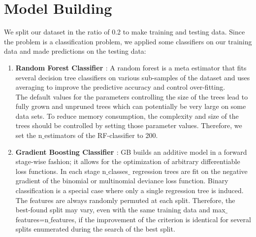 \documentclass[conference]{IEEEtran}
\begin{document}
\section{Model Building}
We split our dataset in the ratio of 0.2 to make training and testing data.
Since the problem is a classification problem, we applied some classifiers on our training data and made predictions on the testing data: 
\begin{enumerate}
    \item \textbf{Random Forest Classifier \cite{rf}}: A random forest is a meta estimator that fits several decision tree classifiers on various sub-samples of the dataset and uses averaging to improve the predictive accuracy and control over-fitting. \\
    The default values for the parameters controlling the size of the trees lead to fully grown and unpruned trees which can potentially be very large on some data sets. To reduce memory consumption, the complexity and size of the trees should be controlled by setting those parameter values. Therefore, we set the n$\_$estimators of the RF-classifier to 200.\\
    \item \textbf{Gradient Boosting Classifier \cite{rf}}:  GB builds an additive model in a forward stage-wise fashion; it allows for the optimization of arbitrary differentiable loss functions. In each stage n$\_$classes$\_$ regression trees are fit on the negative gradient of the binomial or multinomial deviance loss function. Binary classification is a special case where only a single regression tree is induced.\\
    The features are always randomly permuted at each split. Therefore, the best-found split may vary, even with the same training data and max$\_$features=n$\_$features, if the improvement of the criterion is identical for several splits enumerated during the search of the best split.
\end{enumerate}

\newpage
\end{document}
